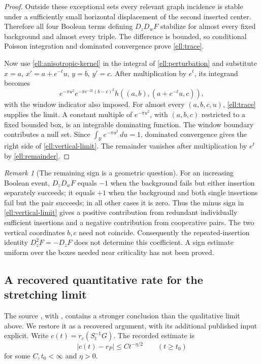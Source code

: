 \documentclass[11pt,a4paper]{article}
\theoremstyle{definition}
\theoremstyle{remark}
\newtheorem{remark}[theorem]{Remark}
\numberwithin{equation}{section}
\begin{document}
\begin{proof}
Outside these exceptional sets every relevant graph incidence
is stable under a sufficiently small horizontal displacement
of the second inserted center.  Therefore all four Boolean
terms defining $D_zD_wF$ stabilize for almost every fixed
background and almost every triple.  The difference is bounded,
so conditional Poisson integration and dominated convergence
prove \eqref{ell:trace}.

Now use \eqref{ell:anisotropic-kernel} in the integral of
\eqref{ell:perturbation} and substitute $x=a$,
$x'=a+e^{-t}u$, $y=b$, $y'=c$.  After multiplication by
$e^t$, its integrand becomes
\[
 e^{-\pi u^2}e^{-\pi e^{-2t}(b-c)^2}
       h((a,b),(a+e^{-t}u,c)),
\]
with the window indicator also imposed.  For almost every
$(a,b,c,u)$, \eqref{ell:trace} supplies the limit.  A constant
multiple of $e^{-\pi u^2}$, with $(a,b,c)$ restricted to a
fixed bounded box, is an integrable dominating function.
The window boundary contributes a null set.  Since
$\int_{\mathbb R}e^{-\pi u^2}\,du=1$, dominated convergence
gives the right side of \eqref{ell:vertical-limit}.  The
remainder vanishes after multiplication by $e^t$ by
\eqref{ell:remainder}.
\end{proof}

\begin{remark}[The remaining sign is a geometric question]
\label{ell:vertical-scope}
For an increasing Boolean event, $D_zD_wF$ equals $-1$ when
the background fails but either insertion separately succeeds;
it equals $+1$ when the background and both single insertions
fail but the pair succeeds; in all other cases it is zero.
Thus the minus sign in \eqref{ell:vertical-limit} gives a
positive contribution from redundant individually sufficient
insertions and a negative contribution from cooperative pairs.
The two vertical coordinates $b,c$ need not coincide.
Consequently the repeated-insertion identity $D_z^2F=-D_zF$
does not determine this coefficient.  A sign estimate uniform
over the boxes needed near criticality has not been proved.
\end{remark}

\subsection{A recovered quantitative rate for the stretching limit}
\label{ell:recovered-rate}

The source , with
, contains a stronger conclusion
than the qualitative limit above. We restore it as a recovered argument,
with its additional published input explicit. Write
$c(t)=r_c(S_t^{-1}G)$. The recorded estimate is
\begin{equation}\label{ell:polynomial-rate}
 |c(t)-r_P|\le C t^{-\eta/2}\qquad(t\ge t_0)
\end{equation}
for some $C,t_0<\infty$ and $\eta>0$.
\end{document}
